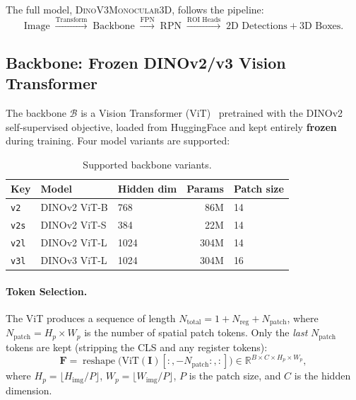\documentclass[runningheads]{llncs}
\newcommand{\mR}{\mathbb{R}}
\newcommand{\op}[1]{\operatorname{#1}}
\newcommand{\mat}[1]{\bm{#1}}
\begin{document}
The full model, \textsc{DinoV3Monocular3D}, follows the pipeline:
\begin{equation}
    \text{Image} \;\xrightarrow{\text{Transform}}\; \text{Backbone} \;\xrightarrow{\text{FPN}}\; \text{RPN} \;\xrightarrow{\text{ROI Heads}}\; \text{2D Detections} + \text{3D Boxes}.
    \label{eq:full_pipeline}
\end{equation}


\subsection{Backbone: Frozen DINOv2/v3 Vision Transformer}
\label{sec:backbone}

The backbone $\mathcal{B}$ is a Vision Transformer (ViT)~\cite{dosovitskiy2021image} pretrained with the DINOv2~\cite{oquab2023dinov2} self-supervised objective, loaded from HuggingFace and kept entirely \textbf{frozen} during training.  Four model variants are supported:

\begin{table}[h]
\centering
\caption{Supported backbone variants.}
\label{tab:backbone_variants}
\small
\begin{tabular}{@{}lllrl@{}}
\toprule
\textbf{Key} & \textbf{Model} & \textbf{Hidden dim} & \textbf{Params} & \textbf{Patch size} \\
\midrule
\texttt{v2}  & DINOv2 ViT-B & 768  &  86M & 14 \\
\texttt{v2s} & DINOv2 ViT-S & 384  &  22M & 14 \\
\texttt{v2l} & DINOv2 ViT-L & 1024 & 304M & 14 \\
\texttt{v3l} & DINOv3 ViT-L & 1024 & 304M & 16 \\
\bottomrule
\end{tabular}
\end{table}

\paragraph{Token Selection.}  The ViT produces a sequence of length $N_{\text{total}} = 1 + N_{\text{reg}} + N_{\text{patch}}$, where $N_{\text{patch}} = H_p \times W_p$ is the number of spatial patch tokens.  Only the \emph{last} $N_{\text{patch}}$ tokens are kept (stripping the CLS and any register tokens):
\begin{equation}
    \mat{F} = \op{reshape}\bigl(\text{ViT}(\mat{I})[:, -N_{\text{patch}}:, :]\bigr) \in \mR^{B \times C \times H_p \times W_p},
    \label{eq:backbone_output}
\end{equation}
where $H_p = \lfloor H_{\text{img}} / P \rfloor$, $W_p = \lfloor W_{\text{img}} / P \rfloor$, $P$ is the patch size, and $C$ is the hidden dimension.
\end{document}
